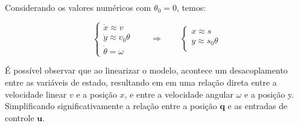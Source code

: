 Considerando os valores numéricos com $\theta_0 = 0$, temos:

\begin{equation}
\begin{cases}
\dot{x} \approx v \\
\dot{y} \approx v_0 \theta \\
\dot{\theta} = \omega
\end{cases}
\qquad
\Rightarrow
\qquad
\begin{cases}
x \approx s \\
y \approx s_0 \theta \\
\end{cases}
\label{eq:linearized_model}
\end{equation}

É possível observar que ao linearizar o modelo, 
acontece um desacoplamento entre as variáveis de estado,
resultando em em uma relação direta entre a velocidade linear $v$ e a posição $x$,
e entre a velocidade angular $\omega$ e a posição y. Simplificando significativamente
 a relação entre a posição $\mathbf{q}$
e as entradas de controle $\mathbf{u}$.